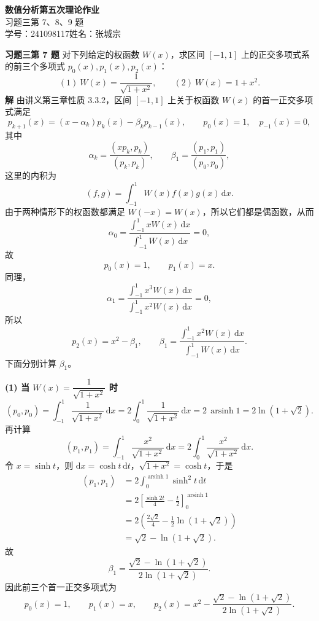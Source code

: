 \documentclass[UTF8,a4paper,11pt]{ctexart}
\newcommand{\inner}[2]{\left(#1,#2\right)}
\begin{document}
\begin{center}
  {\LARGE\bfseries 数值分析\quad 第五次理论作业}\\[6pt]
  {\large 习题三第 7、8、9 题}\\[4pt]
  {\normalsize 学号：241098117\quad 姓名：张城宗}
\end{center}

\bigskip

\noindent\textbf{习题三\quad 第 7 题}\quad
对下列给定的权函数 $W(x)$，求区间 $[-1,1]$ 上的正交多项式系的前三个多项式
$p_0(x),p_1(x),p_2(x)$：
\[
  (1)\ W(x)=\frac{1}{\sqrt{1+x^2}},\qquad
  (2)\ W(x)=1+x^2.
\]
\medskip
\noindent\textbf{解}\quad
由讲义第三章性质 3.3.2，区间 $[-1,1]$ 上关于权函数 $W(x)$ 的首一正交多项式满足
\[
  p_{k+1}(x)=(x-\alpha_k)p_k(x)-\beta_k p_{k-1}(x),\qquad
  p_0(x)=1,\quad p_{-1}(x)=0,
\]
其中
\[
  \alpha_k=\frac{\inner{x p_k}{p_k}}{\inner{p_k}{p_k}},\qquad
  \beta_1=\frac{\inner{p_1}{p_1}}{\inner{p_0}{p_0}},
\]
这里的内积为
\[
  \inner{f}{g}=\int_{-1}^1 W(x)f(x)g(x)\,\mathrm{d}x.
\]
由于两种情形下的权函数都满足 $W(-x)=W(x)$，所以它们都是偶函数，从而
\[
  \alpha_0=\frac{\int_{-1}^1 xW(x)\,\mathrm{d}x}{\int_{-1}^1 W(x)\,\mathrm{d}x}=0,
\]
故
\[
  p_0(x)=1,\qquad p_1(x)=x.
\]
同理，
\[
  \alpha_1=\frac{\int_{-1}^1 x^3W(x)\,\mathrm{d}x}{\int_{-1}^1 x^2W(x)\,\mathrm{d}x}=0,
\]
所以
\[
  p_2(x)=x^2-\beta_1,\qquad
  \beta_1=\frac{\int_{-1}^1 x^2W(x)\,\mathrm{d}x}{\int_{-1}^1 W(x)\,\mathrm{d}x}.
\]
下面分别计算 $\beta_1$。

\medskip
\noindent\textbf{(1) 当 $W(x)=\dfrac{1}{\sqrt{1+x^2}}$ 时}\quad
\[
  \inner{p_0}{p_0}=\int_{-1}^1 \frac{1}{\sqrt{1+x^2}}\,\mathrm{d}x
  =2\int_0^1 \frac{1}{\sqrt{1+x^2}}\,\mathrm{d}x
  =2\,\operatorname{arsinh}1
  =2\ln(1+\sqrt{2}).
\]
再计算
\[
  \inner{p_1}{p_1}=\int_{-1}^1 \frac{x^2}{\sqrt{1+x^2}}\,\mathrm{d}x
  =2\int_0^1 \frac{x^2}{\sqrt{1+x^2}}\,\mathrm{d}x.
\]
令 $x=\sinh t$，则 $\mathrm{d}x=\cosh t\,\mathrm{d}t$，$\sqrt{1+x^2}=\cosh t$，于是
\begin{align*}
  \inner{p_1}{p_1}
  &=2\int_0^{\operatorname{arsinh}1}\sinh^2 t\,\mathrm{d}t \\
  &=2\left[\frac{\sinh 2t}{4}-\frac{t}{2}\right]_0^{\operatorname{arsinh}1} \\
  &=2\left(\frac{2\sqrt{2}}{4}-\frac{1}{2}\ln(1+\sqrt{2})\right) \\
  &=\sqrt{2}-\ln(1+\sqrt{2}).
\end{align*}
故
\[
  \beta_1=\frac{\sqrt{2}-\ln(1+\sqrt{2})}{2\ln(1+\sqrt{2})}.
\]
因此前三个首一正交多项式为
\[
  \boxed{
  p_0(x)=1,\qquad
  p_1(x)=x,\qquad
  p_2(x)=x^2-\frac{\sqrt{2}-\ln(1+\sqrt{2})}{2\ln(1+\sqrt{2})}.}
\]
\end{document}
